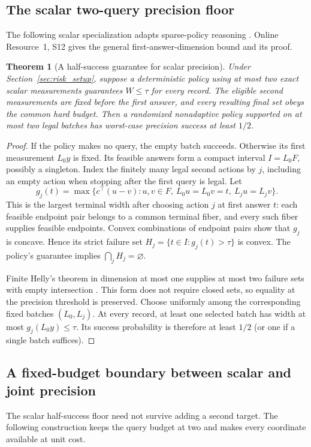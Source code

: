 \documentclass[12pt]{article}
\newtheorem{theorem}{Theorem}
\begin{document}
\subsection{The scalar two-query precision floor}
The following scalar specialization adapts sparse-policy reasoning
\citep[Theorem~2 and Example~5]{kurtz2026}. Online Resource~1, S12 gives
the general first-answer-dimension bound and its proof.

\begin{theorem}[A half-success guarantee for scalar precision]
\label{thm:helly-precision}
Under Section~\ref{sec:risk_setup}, suppose a deterministic policy using
at most two exact scalar measurements guarantees $W\leq\tau$ for every
record. The eligible second measurements are fixed before the first
answer, and every resulting final set obeys the common hard budget.
Then a randomized nonadaptive policy supported on at most two legal
batches has worst-case precision success at least $1/2$.
\end{theorem}
\begin{proof}
If the policy makes no query, the empty batch succeeds. Otherwise its
first measurement $L_0y$ is fixed. Its feasible answers form a compact
interval $I=L_0F$, possibly a singleton. Index the finitely many legal
second actions by $j$, including an empty action when stopping after the
first query is legal. Let
\[
 g_j(t)=\max\{c^\top(u-v):u,v\in F,\ L_0u=L_0v=t,
                                      \ L_ju=L_jv\}.
\]
This is the largest terminal width after choosing action $j$ at first
answer $t$: each feasible endpoint pair belongs to a common terminal
fiber, and every such fiber supplies feasible endpoints. Convex
combinations of endpoint pairs show that $g_j$ is concave. Hence its
strict failure set $H_j=\{t\in I:g_j(t)>\tau\}$ is convex.
The policy's guarantee implies $\bigcap_j H_j=\varnothing$.

Finite Helly's theorem in dimension at most one supplies at most two
failure sets with empty intersection \citep[Theorem~1.1]{amenta2016}.
This form does not require closed sets, so equality at the precision
threshold is preserved. Choose uniformly among the corresponding
fixed batches $(L_0,L_j)$. At every record, at least one selected batch
has width at most $g_j(L_0y)\leq\tau$. Its success probability is
therefore at least $1/2$ (or one if a single batch suffices).
\end{proof}
\subsection{A fixed-budget boundary between scalar and joint precision}
\label{sec:two-target-boundary}
The scalar half-success floor need not survive adding a second target.
The following construction keeps the query budget at two and makes every
coordinate available at unit cost.
\end{document}
